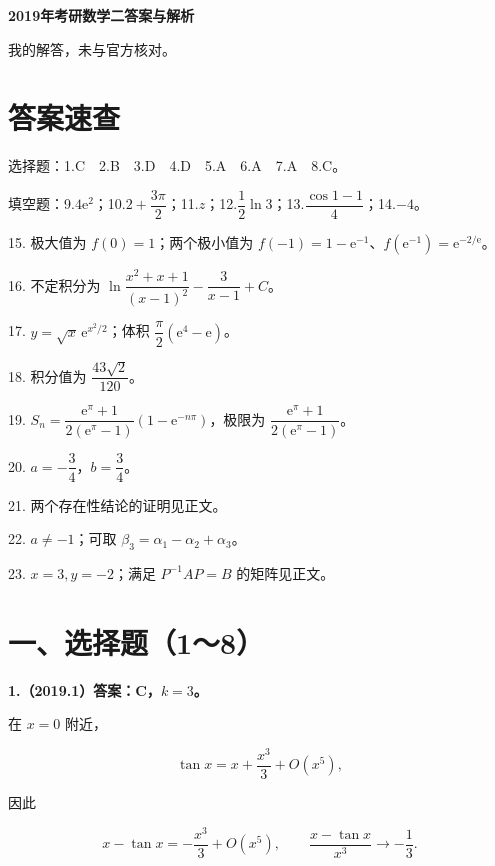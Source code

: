 \documentclass[UTF8,11pt,fontset=windows]{ctexart}
\begin{document}
{\LARGE\bfseries 2019年考研数学二答案与解析\par}\vspace{6pt}

\begingroup\color{gray}我的解答，未与官方核对。\par\endgroup

\section*{答案速查}

\begingroup\color{gray}选择题：1.C　2.B　3.D　4.D　5.A　6.A　7.A　8.C。\par\endgroup

\begingroup\color{gray}填空题：9.$4\mathrm e^2$；10.$2+\dfrac{3\pi}{2}$；11.$z$；12.$\dfrac12\ln3$；13.$\dfrac{\cos1-1}{4}$；14.$-4$。\par\endgroup

15. 极大值为 $f(0)=1$；两个极小值为 $f(-1)=1-\mathrm e^{-1}$、$f(\mathrm e^{-1})=\mathrm e^{-2/\mathrm e}$。

16. 不定积分为 $\ln\dfrac{x^2+x+1}{(x-1)^2}-\dfrac3{x-1}+C$。

17. $y=\sqrt x\,\mathrm e^{x^2/2}$；体积 $\dfrac\pi2(\mathrm e^4-\mathrm e)$。

18. 积分值为 $\dfrac{43\sqrt2}{120}$。

19. $S_n=\dfrac{\mathrm e^\pi+1}{2(\mathrm e^\pi-1)}(1-\mathrm e^{-n\pi})$，极限为 $\dfrac{\mathrm e^\pi+1}{2(\mathrm e^\pi-1)}$。

20. $a=-\dfrac34$，$b=\dfrac34$。

21. 两个存在性结论的证明见正文。

22. $a\ne-1$；可取 $\beta_3=\alpha_1-\alpha_2+\alpha_3$。

23. $x=3,y=-2$；满足 $P^{-1}AP=B$ 的矩阵见正文。

\clearpage

\section*{一、选择题（1～8）}

\textbf{1.（2019.1）答案：C，$k=3$。}

在 $x=0$ 附近，

$$
\tan x=x+\frac{x^3}{3}+O(x^5),
$$

因此

$$
x-\tan x=-\frac{x^3}{3}+O(x^5),
\qquad\frac{x-\tan x}{x^3}\longrightarrow-\frac13.
$$
\end{document}
